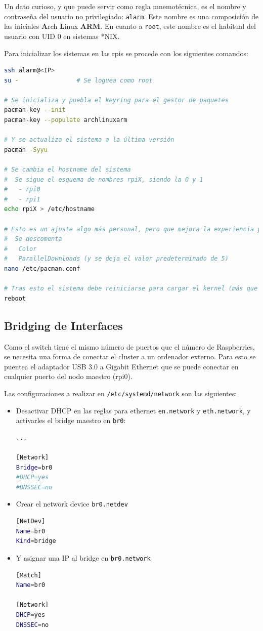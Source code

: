 Un dato curioso, y que puede servir como regla mnemotécnica, es el nombre y contraseña del usuario no privilegiado: \texttt{alarm}. Este nombre es una composición de las iniciales \textbf{A}rch \textbf{L}inux \textbf{ARM}. En cuanto a \texttt{root}, este nombre es el habitual del usuario con UID 0 en sistemas *NIX.

Para inicializar los sistemas en las \acrshort{rpi}s se procede con los siguientes comandos:

\begin{lstlisting}[language=bash]
ssh alarm@<IP>
su -                # Se loguea como root

# Se inicializa y puebla el keyring para el gestor de paquetes
pacman-key --init
pacman-key --populate archlinuxarm

# Y se actualiza el sistema a la última versión
pacman -Syyu

# Se cambia el hostname del sistema
#  Se sigue el esquema de nombres rpiX, siendo la 0 y 1
#   - rpi0
#   - rpi1
echo rpiX > /etc/hostname

# Esto es un ajuste algo más personal, pero que mejora la experiencia y velocidad en las actualizaciones: se edita el archivo /etc/pacman.conf
#  Se descomenta
#   Color
#   ParallelDownloads (y se deja el valor predeterminado de 5)
nano /etc/pacman.conf

# Tras esto el sistema debe reiniciarse para cargar el kernel (más que probablemente) actualizado
reboot
\end{lstlisting}

\subsection{Bridging de Interfaces}
Como el switch tiene el mismo número de puertos que el número de Raspberries, se necesita una forma de conectar el cluster a un ordenador externo. Para esto se puentea el adaptador USB 3.0 a Gigabit Ethernet que se puede conectar en cualquier puerto del nodo maestro (rpi0).

Las configuraciones a realizar en \texttt{/etc/systemd/network} son las siguientes:

\begin{itemize}
    \item Desactivar DHCP en las reglas para ethernet \texttt{en.network} y \texttt{eth.network}, y activarles el bridge maestro en \texttt{br0}:
\begin{lstlisting}[language=bash]
...

[Network]
Bridge=br0
#DHCP=yes
#DNSSEC=no
\end{lstlisting}
    \item Crear el network device \texttt{br0.netdev}
\begin{lstlisting}[language=bash]
[NetDev]
Name=br0
Kind=bridge
\end{lstlisting}
    \item Y asignar una IP al bridge en \texttt{br0.network}
\begin{lstlisting}[language=bash]
[Match]
Name=br0

[Network]
DHCP=yes
DNSSEC=no
\end{lstlisting}
\end{itemize}

